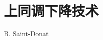 \renewcommand{\thechapter}{Vbis}
\setcounter{chapter}{5}
\chapter{上同调下降技术}
\begin{center}B. Saint-Donat\end{center}
\label{sga4.exp.Vbis}
\setcounter{pageoriginal}{83}
\let\cosk=\cosq
\let\Ysheaf=\sheaf

\setcounter{chapter}{5}
\renewcommand{\thechapter}{\Roman{chapter}}
